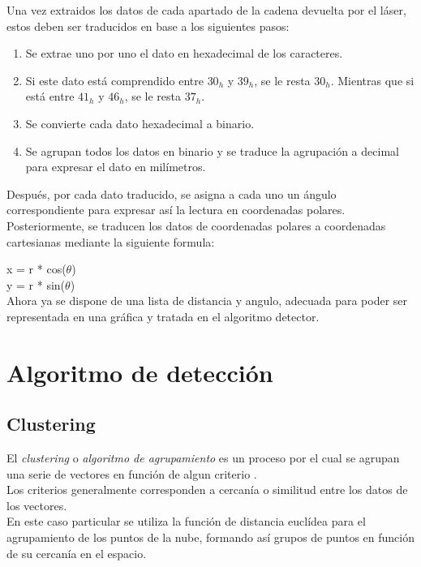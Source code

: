	Una vez extraidos los datos de cada apartado de la cadena devuelta por el láser, estos deben ser traducidos en base a los 			siguientes pasos:
	\begin{enumerate}
		\item Se extrae uno por uno el dato en hexadecimal de los caracteres.
		\item Si este dato está comprendido entre $30_{h}$ y  $39_{h}$, se le resta  $30_{h}$. Mientras que si está entre  				$41_{h}$ y  $46_{h}$, se le resta $37_{h}$.
		\item Se convierte cada dato hexadecimal a binario.
		\item Se agrupan todos los datos en binario y se traduce la agrupación a decimal para expresar el dato en milímetros.
	\end{enumerate}
	
	Después, por cada dato traducido, se asigna a cada uno un ángulo correspondiente para expresar así la lectura en coordenadas		polares.\\
	Posteriormente, se traducen los datos de coordenadas polares a coordenadas cartesianas mediante la siguiente formula:

	x = r * cos(\(\theta\))\\
	y = r * sin(\(\theta\))\\

	Ahora ya se dispone de una lista de distancia y angulo, adecuada para poder ser representada en una gráfica y tratada en el algoritmo detector.\\


\section{Algoritmo de detección}

	\subsection{Clustering}
	El \emph{clustering} o \emph{algoritmo de agrupamiento} es un proceso por el cual se agrupan una serie de vectores en función de algun criterio \cite{wiki:clustering} .\\ 
Los criterios generalmente corresponden a cercanía o similitud entre los datos de los vectores.\\
En este caso particular se utiliza la función de distancia euclídea para el agrupamiento de los puntos de la nube, formando así grupos de puntos en función de su cercanía en el espacio.\\

